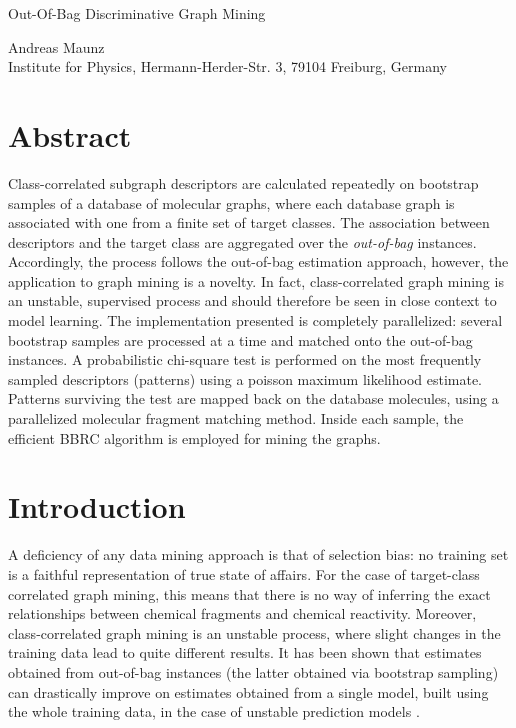 \documentclass{article}
\begin{document}

\begin{center}
\begin{huge}Out-Of-Bag Discriminative Graph Mining\end{huge}

Andreas Maunz \\Institute for Physics, Hermann-Herder-Str. 3, 79104 Freiburg, Germany
\end{center}

\section{Abstract}
Class-correlated subgraph descriptors are calculated repeatedly on bootstrap samples of a database of molecular graphs, where each database graph is associated with one from a finite set of target classes. 
The association between descriptors and the target class are aggregated over the \emph{out-of-bag} instances. Accordingly, the process follows the out-of-bag estimation approach, however, the application to graph mining is a novelty. 
In fact, class-correlated graph mining is an unstable, supervised process and should therefore be seen in close context to model learning.
The implementation presented is completely parallelized: several bootstrap samples are processed at a time and matched onto the out-of-bag instances. 
A probabilistic chi-square test is performed on the most frequently sampled descriptors (patterns) using a poisson maximum likelihood estimate.
Patterns surviving the test are mapped back on the database molecules, using a parallelized molecular fragment matching method.
Inside each sample, the efficient BBRC algorithm is employed for mining the graphs. 

\section{Introduction}
A deficiency of any data mining approach is that of selection bias: no training set is a faithful representation of true state of affairs. For the case of target-class correlated graph mining, this means that there is no way of inferring the exact relationships between chemical fragments and chemical reactivity. Moreover, class-correlated graph mining is an unstable process, where slight changes in the training data lead to quite different results. 
It has been shown that estimates obtained from out-of-bag instances (the latter obtained via bootstrap sampling) can drastically improve on estimates obtained from a single model, built using the whole training data, in the case of unstable prediction models \cite{breiman96oob}.
\end{document}
